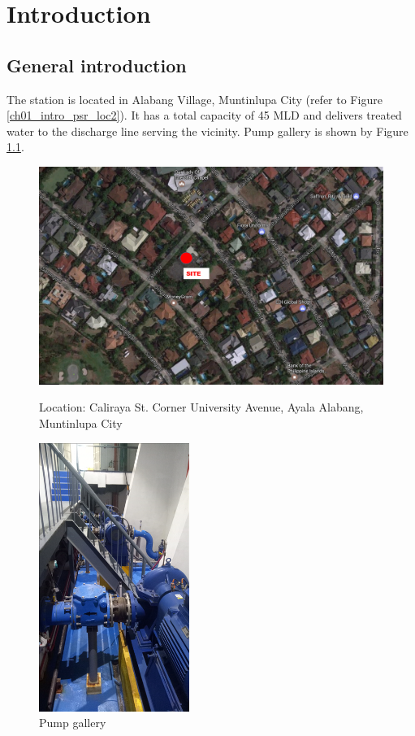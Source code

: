 
\chapter{Introduction} %
\label{Chapter1}

\section{General introduction} \label{namdario}
The station is located in Alabang Village, Muntinlupa City (refer to Figure \ref{ch01_intro_psr_loc2}). It has a total capacity of 45 MLD and delivers treated water to the discharge line serving the vicinity. Pump gallery is shown by Figure \ref{ch01_intro_pump_gallery}.


\begin{figure}[!htb]
	\begin{minipage}[b]{0.5\linewidth}
		\centering
		\includegraphics[width=\textwidth]{figures/ch01_intro_psr_loc2}
		\caption{Location: Caliraya St. Corner University Avenue, Ayala Alabang, Muntinlupa City}
		\label{ch01_intro_psr_loc2}
	\end{minipage}
	\hspace{0.05cm}
	\begin{minipage}[b]{0.5\linewidth}
		\centering
		\includegraphics[scale=2]{figures/ch01_intro_pump_gallery}
		\caption{Pump gallery}
		\label{ch01_intro_pump_gallery}
	\end{minipage}
\end{figure}

